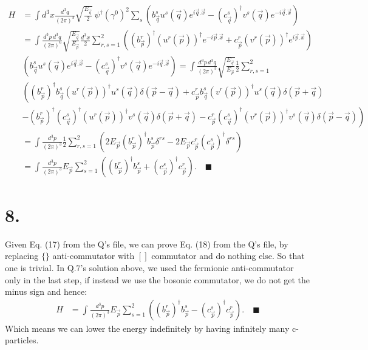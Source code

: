 \documentclass{article}
\newcommand{\pdotx}{\vec{p}.\vec{x}}
\newcommand{\qdotx}{\vec{q}.\vec{x}}
\newcommand{\vecp}{\vec{p}}
\newcommand{\vecq}{\vec{q}}
\begin{document}
\begin{equation}
    \begin{split}
        H &= \int d^3x\frac{d^3q}{(2\pi)^3}\sqrt{\frac{E_{\vecq}}{2}} \, \psi^\dagger (\gamma^0)^2 \sum_s\left(b^s_{\vecq}u^s(\vecq)e^{i\qdotx}-(c^s_{\vecq} )^\dagger v^s(\vecq)e^{-i\qdotx} \right)\\
        &= \int \frac{d^3p\, d^3q}{(2\pi)^6}\sqrt{\frac{E_{\vecq}}{E_{\vecp}}}\frac{d^3x}{2}\sum_{r,s=1}^2\left((b^r_{\vecp})^\dagger(u^r(\vecp))^\dagger e^{-i\pdotx}+c_{\vecp}^r (v^r(\vecp))^\dagger e^{i\pdotx}\right)\\
        & \left( b^s_{\vecq}u^s(\vecq)e^{i\qdotx}-(c^s_{\vecq} )^\dagger v^s(\vecq)e^{-i\qdotx}\right) =\int \frac{d^3p\, d^3q}{(2\pi)^3}\sqrt{\frac{E_{\vecq}}{E_{\vecp}}}\frac{1}{2}\sum_{r,s=1}^2 \\
        & \left( (b^r_{\vecp})^\dagger b^s_{\vecq}(u^r(\vecp))^\dagger u^s(\vecq) \delta(\vecp-\vecq) + c_{\vecp}^rb^s_{\vecq} (v^r(\vecp))^\dagger u^s(\vecq) \delta(\vecp+\vecq) \right. \\
        & \left. -(b^r_{\vecp})^\dagger (c^s_{\vecq} )^\dagger (u^r(\vecp))^\dagger v^s(\vecq) \delta(\vecp+\vecq) - c_{\vecp}^r (c^s_{\vecq} )^\dagger (v^r(\vecp))^\dagger v^s(\vecq)\delta(\vecp-\vecq)\right) \\ 
        & =\int \frac{d^3p}{(2\pi)^3}\frac{1}{2}\sum_{r,s=1}^2 \left( 2E_{\vecp}(b^r_{\vecp})^\dagger b^s_{\vecp} \delta^{rs} - 2E_{\vecp} c_{\vecp}^r (c^s_{\vecp})^\dagger  \delta^{rs}  \right) \\
        & = \int \frac{d^3p}{(2\pi)^3} E_{\vecp}\sum_{s=1}^2\left( (b^r_{\vecp})^\dagger b^s_{\vecp} +(c^s_{\vecp})^\dagger c_{\vecp}^r  \right). \quad \blacksquare
    \end{split}
\end{equation}
\section*{8.}
Given Eq. (17) from the Q's file, we can prove Eq. (18) from the Q's file, by replacing $\{\}$ anti-commutator with $[]$ commutator and do nothing else. So that one is trivial. In Q.7's solution above, we used the fermionic anti-commutator only in the last step, if instead we use the bosonic commutator, we do not get the minus sign and hence:
\begin{equation}
    \begin{split}
        H &= \int \frac{d^3p}{(2\pi)^3} E_{\vecp}\sum_{s=1}^2\left( (b^r_{\vecp})^\dagger b^s_{\vecp} -(c^s_{\vecp})^\dagger c_{\vecp}^r  \right). \quad \blacksquare
    \end{split}
\end{equation}
Which means we can lower the energy indefinitely by having infinitely many c-particles.
\end{document}
